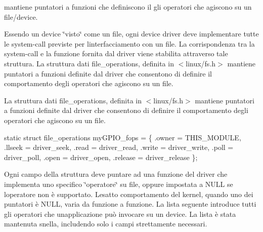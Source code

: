 mantiene puntatori a funzioni che definiscono il gli operatori che agiscono su un file/device. 

Essendo un device \char`\"{}visto\char`\"{} come un file, ogni device driver deve implementare tutte le system-\/call previste per l\textquotesingle{}interfacciamento con un file. La corrispondenza tra la system-\/call e la funzione fornita dal driver viene stabilita attraverso tale struttura. La struttura dati file\+\_\+operations, definita in $<$linux/fs.\+h$>$ mantiene puntatori a funzioni definite dal driver che consentono di definire il comportamento degli operatori che agiscono su un file.

La struttura dati file\+\_\+operations, definita in $<$linux/fs.\+h$>$ mantiene puntatori a funzioni definite dal driver che consentono di definire il comportamento degli operatori che agiscono su un file. 
\begin{DoxyCode}
\textcolor{keyword}{static} \textcolor{keyword}{struct }file\_operations myGPIO\_fops = \{
    .owner      = THIS\_MODULE,
    .llseek     = driver\_seek,
    .read       = driver\_read,
    .write      = driver\_write,
    .poll       = driver\_poll,
    .open       = driver\_open,
    .release    = driver\_release
\};
\end{DoxyCode}
 Ogni campo della struttura deve puntare ad una funzione del driver che implementa uno specifico \char`\"{}operatore\char`\"{} su file, oppure impostata a N\+U\+LL se l\textquotesingle{}operatore non è supportato. L\textquotesingle{}esatto comportamento del kernel, quando uno dei puntatori è N\+U\+LL, varia da funzione a funzione. La lista seguente introduce tutti gli operatori che un\textquotesingle{}applicazione può invocare su un device. La lista è stata mantenuta snella, includendo solo i campi strettamente necessari.


